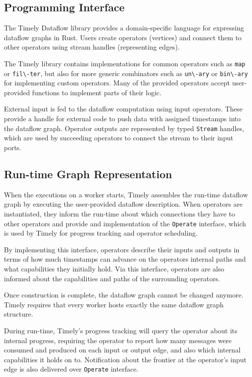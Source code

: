 \begin{addedbar}
\subsection{Programming Interface}

The Timely Dataflow library provides a domain-specific language for expressing
dataflow graphs in Rust. Users create operators (vertices) and connect
them to other operators using stream handles (representing edges).

The Timely library contains implementations for common operators such as
\lstinline{map} or \lstinline{fil\-ter}, but also for more generic combinators
such as \lstinline{un\-ary} or \lstinline{bin\-ary} for implementing custom operators.
Many of the provided operators accept user-provided functions to implement
parts of their logic.

External input is fed to the dataflow computation using input operators. These
provide a handle for external code to push data with assigned timestamps into
the dataflow graph. Operator outputs are represented
by typed \lstinline{Stream} handles, which are used by succeeding operators
to connect the stream to their input ports.

\subsection{Run-time Graph Representation} \label{sec:runtime-graph}

When the executions on a worker starts, Timely assembles the run-time
dataflow graph by executing the user-provided dataflow description. 
When operators are instantiated, they inform the run-time about which
connections they have to other operators and provide and implementation
of the \lstinline{Operate} interface, which is used by Timely for progress
tracking and operator scheduling.

By implementing this interface, operators describe their inputs and
outputs in terms of how much timestamps can advance on the operators internal
paths and what capabilities they initially hold. Via this interface, operators
are also informed about the capabilities and paths of the surrounding operators.

Once construction is complete, the dataflow graph cannot be changed anymore.
Timely requires that every worker hosts exactly the same dataflow graph
structure.

During run-time, Timely's progress tracking will query the operator about its
internal progress, requiring the operator to report how many messages were
consumed and produced on each input or output edge, and also which internal
capabilities it holds on to. Notification about the frontier at the
operator's input edge is also delivered over \lstinline{Operate} interface.


\end{addedbar}
